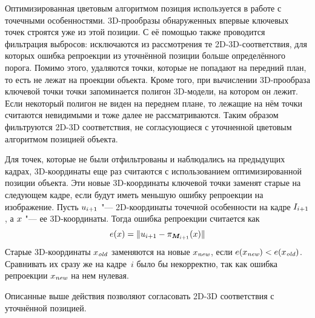 Оптимизированная цветовым алгоритмом позиция используется в работе с точечными
особенностями.
3D-прообразы обнаруженных впервые ключевых точек строятся уже из этой позиции.
С её помощью также проводится фильтрация выбросов: исключаются из рассмотрения
те 2D-3D-соответствия, для которых ошибка репроекции из уточнённой позиции
больше определённого порога.
Помимо этого, удаляются точки, которые не попадают на передний план, то есть не
лежат на проекции объекта.
Кроме того, при вычислении 3D-прообраза ключевой точки точки запоминается
полигон 3D-модели, на котором он лежит.
Если некоторый полигон не виден на переднем плане, то лежащие на нём точки
считаются невидимыми и тоже далее не рассматриваются.
Таким образом фильтруются 2D-3D соответствия, не согласующиеся с уточненной
цветовым алгоритмом позицией объекта.

Для точек, которые не были отфильтрованы и наблюдались на предыдущих кадрах,
3D-координаты еще раз считаются с использованием оптимизированной позиции
объекта.
Эти новые 3D-координаты ключевой точки заменят старые на следующем кадре, если
будут иметь меньшую ошибку репроекции на изображение.
Пусть $\mathnormal{u}_{i + 1}$ "--- 2D-координаты точечной особенности на кадре
$I_{i + 1}$, а $\mathnormal{x}$ "--- ее 3D-координаты.
Тогда ошибка репроекции считается как
\begin{equation}\label{eqn:err_reproj}
    \mathnormal{e}( \mathnormal{x} ) = \| \mathnormal{u}_{i + 1} - \pi_{\bm{M}_{i + 1}}(\mathnormal{x}) \|
\end{equation}
Старые 3D-координаты $\mathnormal{x}_{\text {\it old}}$ заменяются на новые $\mathnormal{x}_{\text{\it new}}$, если
$\mathnormal{e}( \mathnormal{x}_{\text{\it new}} ) < \mathnormal{e}( \mathnormal{x}_{\text {\it old}} )$.
Сравнивать их сразу же на кадре~$i$ было бы некорректно, так как ошибка
репроекции $\mathnormal{x}_{\text{\it new}}$ на нем нулевая.

Описанные выше действия позволяют согласовать 2D-3D соответствия с уточнённой
позицией.
